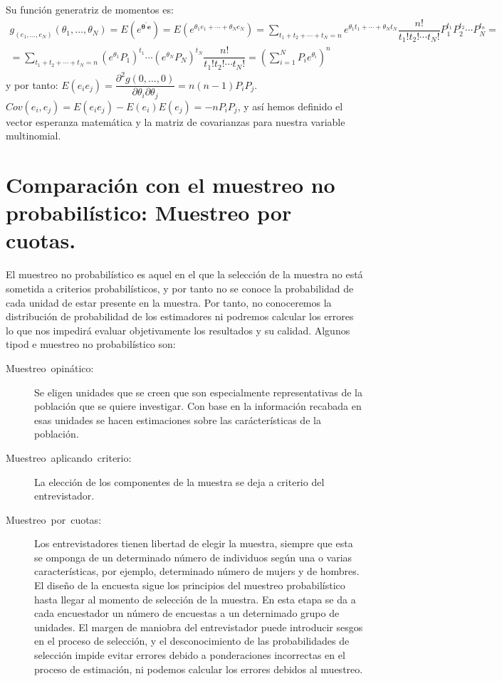 Su funci\'on generatriz de momentos es:
\[
\begin{array}{c}
g_{\left(e_{1},\ldots,e_{N}\right)}\left(\theta_{1},\ldots,\theta_{N}\right)=E\left(e^{\boldsymbol{\theta}^{\prime}\boldsymbol{e}}\right)=E\left(e^{\theta_{1}e_{1}+\cdots+\theta_{N}e_{N}}\right)=\sum_{t_{1}+t_{2}+\cdots+t_{N}=n}e^{\theta_{1}t_{1}+\cdots+\theta_{N}t_{N}}\dfrac{n!}{t_{1}!t_{2}!\cdots t_{N}!}P_{1}^{t_{1}}P_{2}^{t_{2}}\cdots P_{N}^{t_{n}}=\\
=\sum_{t_{1}+t_{2}+\cdots+t_{N}=n}\left(e^{\theta_{1}}P_{1}\right)^{t_{1}}\cdots\left(e^{\theta_{N}}P_{N}\right)^{t_{N}}\dfrac{n!}{t_{1}!t_{2}!\cdots t_{N}!}=\left(\sum_{i=1}^{N}P_{i}e^{\theta_{i}}\right)^{n}
\end{array}
\]
 y por tanto: $E\left(e_{i}e_{j}\right)=\dfrac{\partial^{2}g\left(0,\ldots,0\right)}{\partial\theta_{i}\partial\theta_{j}}=n\left(n-1\right)P_{i}P_{j}$.
$Cov\left(e_{i},e_{j}\right)=E\left(e_{i}e_{j}\right)-E\left(e_{i}\right)E\left(e_{j}\right)=-nP_{i}P_{j}$,
y as\'i hemos definido el vector esperanza matem\'atica y la matriz de
covarianzas para nuestra variable multinomial.


\section{Comparaci\'on con el muestreo no probabil\'istico: Muestreo por cuotas.}

El muestreo no probabil\'istico es aquel en el que la selecci\'on de la
muestra no est\'a sometida a criterios probabil\'isticos, y por tanto
no se conoce la probabilidad de cada unidad de estar presente en la
muestra. Por tanto, no conoceremos la distribuci\'on de probabilidad
de los estimadores ni podremos calcular los errores lo que nos impedir\'a
evaluar objetivamente los resultados y su calidad. Algunos tipod e
muestreo no probabil\'istico son:
\begin{description}
\item [{Muestreo~opin\'atico:}] Se eligen unidades que se creen que son
especialmente representativas de la poblaci\'on que se quiere investigar.
Con base en la informaci\'on recabada en esas unidades se hacen estimaciones
sobre las car\'acter\'isticas de la poblaci\'on.
\item [{Muestreo~aplicando~criterio:}] La elecci\'on de los componentes
de la muestra se deja a criterio del entrevistador.
\item [{Muestreo~por~cuotas:}] Los entrevistadores tienen libertad de
elegir la muestra, siempre que esta se omponga de un determinado n\'umero
de individuos seg\'un una o varias caracter\'isticas, por ejemplo, determinado
n\'umero de mujers y de hombres. El dise\~no de la encuesta sigue los
principios del muestreo probabil\'istico hasta llegar al momento de
selecci\'on de la muestra. En esta etapa se da a cada encuestador un
n\'umero de encuestas a un deternimado grupo de unidades. El margen
de maniobra del entrevistador puede introducir sesgos en el proceso
de selecci\'on, y el desconocimiento de las probabilidades de selecci\'on
impide evitar errores debido a ponderaciones incorrectas en el proceso
de estimaci\'on, ni podemos calcular los errores debidos al muestreo.%
\end{description}

